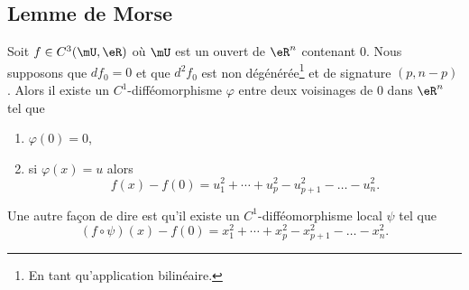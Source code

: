 \subsection{Lemme de Morse}

\begin{lemma}     \label{LemNQAmCLo}
	Soit \( f\in C^3(\mU,\eR)\) où \( \mU\) est un ouvert de \( \eR^n\) contenant \( 0\). Nous supposons que \( df_0=0\) et que \( d^2f_0\) est non dégénérée\footnote{En tant qu'application bilinéaire.} et de signature \( (p,n-p)\). Alors il existe un \( C^1\)-difféomorphisme \( \varphi\) entre deux voisinages de \( 0\) dans \( \eR^n\) tel que
	\begin{enumerate}
		\item
		      \( \varphi(0)=0\),
		\item
		      si \( \varphi(x)=u\) alors
		      \begin{equation}
			      f(x)-f(0)=u_1^2+\cdots +u_p^2-u_{p+1}^2-\ldots-u_n^2.
		      \end{equation}
	\end{enumerate}
	Une autre façon de dire est qu'il existe un \( C^1\)-difféomorphisme local \( \psi\) tel que
	\begin{equation}
		(f\circ\psi)(x)-f(0)=x_1^2+\cdots +x_p^2-x_{p+1}^2-\ldots-x_n^2.
	\end{equation}
\end{lemma}

